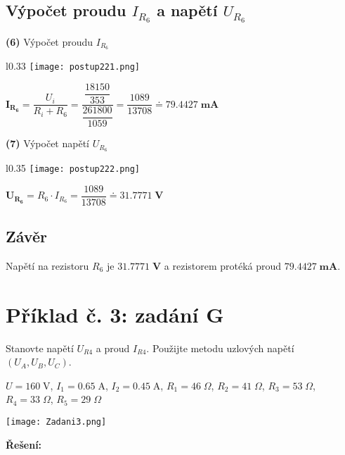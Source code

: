 \documentclass[a4paper,12pt]{article}
\begin{document}
\subsection{Výpočet proudu $I_{R_6}$ a napětí $U_{R_6}$}
\hspace{1em}\textbf{(6)} Výpočet proudu $I_{R_6}$\par\vspace{0.8em}
\begin{wrapfigure}{l}{0.33\textwidth}
\vspace{-60pt}
\texttt{[image: postup221.png]}
\vspace{-75pt}
\end{wrapfigure}
\vspace{25pt}
\hspace{1em}$\mathbf{I_{R_6}}=\dfrac{U_i}{R_i+R_6}=\dfrac{\dfrac{18150}{353}}{\dfrac{261800}{1059}}=\dfrac{1089}{13708}\doteq \mathbf{ 79.4427 \;\si{\milli\ampere}}$\par\vspace{4em}
\hspace{1em}\textbf{(7)} Výpočet napětí $U_{R_6}$\par\vspace{0.8em}
\begin{wrapfigure}{l}{0.35\textwidth}
\vspace{-50pt}
\texttt{[image: postup222.png]}
\vspace{-75pt}
\end{wrapfigure}
\vspace{30pt}
\hspace{1em}$\mathbf{U_{R_6}}=R_6\cdot I_{R_6}=\dfrac{1089}{13708}\doteq \mathbf{ 31.7771 \;\si{\volt}}$\par\vspace{4.8em}
\subsection{Závěr}\par
Napětí na rezistoru $R_6$ je $\mathbf{31.7771 \;\si{\volt}}$  a rezistorem protéká proud $\mathbf{79.4427 \;\si{\milli\ampere}}$.\newpage
\section{Příklad č. 3: zadání G}
Stanovte napětí $U_{R4}$ a proud $I_{R4}$. Použijte metodu uzlových napětí $(U_A, U_B, U_C)$.\par\vspace{1.5em}
$U=160\;\si{\volt}$, $I_1=0.65\;\si{\ampere}$, $I_2=0.45\;\si{\ampere}$, $R_1=46\;\si{\Omega}$, $R_2=41\;\si{\Omega}$, $R_3=53\;\si{\Omega}$, $R_4=33\;\si{\Omega}$, $R_5=29\;\si{\Omega}$\vspace{1em}
\begin{center}
\texttt{[image: Zadani3.png]}
\end{center}\par\vspace{1em}
\newpage
\textbf{\large Řešení:}
\vspace{-1.2em}
\end{document}
